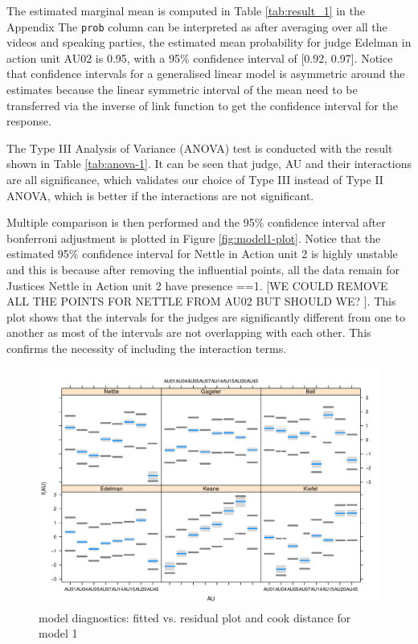 \documentclass{monashthesis}
\begin{document}
The estimated marginal mean is computed in Table \ref{tab:result_1} in the Appendix The \texttt{prob} column can be interpreted as after averaging over all the videos and speaking parties, the estimated mean probability for judge Edelman in action unit AU02 is 0.95, with a 95\% confidence interval of {[}0.92, 0.97{]}. Notice that confidence intervals for a generalised linear model is asymmetric around the estimates because the linear symmetric interval of the mean need to be transferred via the inverse of link function to get the confidence interval for the response.

The Type III Analysis of Variance (ANOVA) test is conducted with the result shown in Table \ref{tab:anova-1}. It can be seen that judge, AU and their interactions are all significance, which validates our choice of Type III instead of Type II ANOVA, which is better if the interactions are not significant.

Multiple comparison is then performed and the 95\% confidence interval after bonferroni adjustment is plotted in Figure \ref{fig:model1-plot}. Notice that the estimated 95\% confidence interval for Nettle in Action unit 2 is highly unstable and this is because after removing the influential points, all the data remain for Justices Nettle in Action unit 2 have presence ==1. {[}WE COULD REMOVE ALL THE POINTS FOR NETTLE FROM AU02 BUT SHOULD WE? {]}. This plot shows that the intervals for the judges are significantly different from one to another as most of the intervals are not overlapping with each other. This confirms the necessity of including the interaction terms.

\begin{figure}

{\centering \includegraphics[width=1\linewidth]{figures/mod1-diag-1-1} 

}

\caption{model diagnostics: fitted vs. residual plot and cook distance for model 1}\label{fig:mod1-diag-1}
\end{figure}
\end{document}
